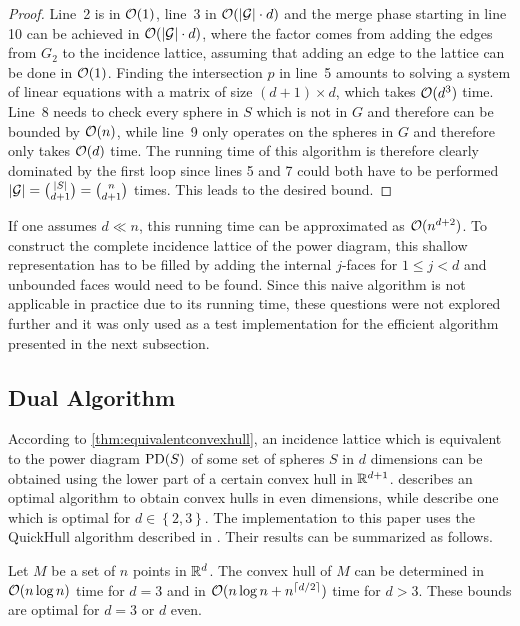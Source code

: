 \begin{proof}
    Line~2 is in $\mathcal{O}(1)$, line~3 in $\mathcal{O}(\left\vert \mathcal{G} \right\vert \cdot d)$ and the merge phase starting in line 10 can be achieved in $\mathcal{O}(\left\vert \mathcal{G} \right\vert \cdot d)$, where the factor comes from adding the edges from $G_2$ to the incidence lattice, assuming that adding an edge to the lattice can be done in $\mathcal{O}(1)$.
    Finding the intersection $p$ in line~5 amounts to solving a system of linear equations with a matrix of size $(d+1) \times d$, which takes $\mathcal{O}(d^3)$ time.
    Line~8 needs to check every sphere in $S$ which is not in $G$ and therefore can be bounded by $\mathcal{O}(n)$, while line~9 only operates on the spheres in $G$ and therefore only takes $\mathcal{O}(d)$ time.
    The running time of this algorithm is therefore clearly dominated by the first loop since lines 5 and 7 could both have to be performed $\left\vert \mathcal{G} \right\vert = \binom{\left\vert S \right\vert}{d + 1} = \binom{n}{d + 1}$ times.
    This leads to the desired bound.
\end{proof}

If one assumes $d \ll n$, this running time can be approximated as $\mathcal{O}(n^{d+2})$.
To construct the complete incidence lattice of the power diagram, this shallow representation has to be filled by adding the internal $j$-faces for $1 \leq j < d$ and unbounded faces would need to be found.
Since this naive algorithm is not applicable in practice due to its running time, these questions were not explored further and it was only used as a test implementation for the efficient algorithm presented in the next subsection.

\subsection{Dual Algorithm}
\label{sub:dual_algorithm}
According to \cref{thm:equivalentconvexhull}, an incidence lattice which is equivalent to the power diagram $\operatorname{PD}(S)$ of some set of spheres $S$ in $d$ dimensions can be obtained using the lower part of a certain convex hull in $\mathbb{R}^{d+1}$.
\Textcite{seidel1981convex} describes an optimal algorithm to obtain convex hulls in even dimensions, while \textcite{preparata1977convex} describe one which is optimal for $d \in \left\{ 2, 3 \right\}$.
The implementation to this paper uses the QuickHull algorithm described in \cite{barber1996quickhull}.
Their results can be summarized as follows.
\begin{lemma}
    \label{lem:convexhulls}
    Let $M$ be a set of $n$ points in $\mathbb{R}^d$.
    The convex hull of $M$ can be determined in $\mathcal{O}(n \log n)$ time for $d = 3$ and in $\mathcal{O}(n \log n + n^{\left\lceil d/2\right\rceil})$ time for $d > 3$.
    These bounds are optimal for $d = 3$ or $d$ even.
\end{lemma}


